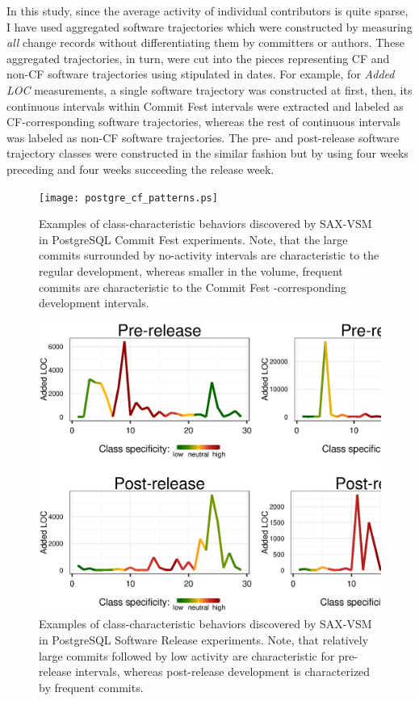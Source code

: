 In this study, since the average activity of individual contributors is quite sparse, I have used aggregated software trajectories which were constructed by measuring \textit{all} change records without differentiating them by committers or authors. These aggregated trajectories, in turn, were cut into the pieces representing CF and non-CF software trajectories using stipulated in \cite{commit-fest} dates. For example, for \textit{Added LOC} measurements, a single software trajectory was constructed at first, then, its continuous intervals within Commit Fest intervals were extracted and labeled as CF-corresponding software trajectories, whereas the rest of continuous intervals was labeled as non-CF software trajectories. The pre- and post-release software trajectory classes were constructed in the similar fashion but by using four weeks preceding and four weeks succeeding the release week.

\begin{figure}[t]
   \centering
   \texttt{[image: postgre\_cf\_patterns.ps]}
   \caption[Examples of class-characteristic behaviors discovered by SAX-VSM in PostgreSQL Commit Fest experiments.]
   {Examples of class-characteristic behaviors discovered by SAX-VSM in PostgreSQL Commit Fest experiments. Note, that the large commits surrounded by no-activity intervals are characteristic to the regular development, whereas smaller in the volume, frequent commits are characteristic to the Commit Fest -corresponding development intervals. }
   \label{fig:postgre_cf_patterns}   
   \includegraphics[width=145mm]{figures/postgre_release_patterns.ps}
   \caption[Examples of class-characteristic behaviors discovered by SAX-VSM in PostgreSQL Software Release experiments.]
   {Examples of class-characteristic behaviors discovered by SAX-VSM in PostgreSQL Software Release experiments. Note, that relatively large commits followed by low activity are characteristic for pre-release intervals, whereas post-release development is characterized by frequent commits.}
   \label{fig:postgre_release_patterns}
\end{figure}

